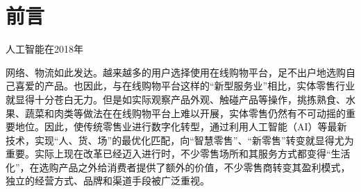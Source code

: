 \section{前\hspace{1em}言}

人工智能在2018年

网络、物流如此发达。越来越多的用户选择使用在线购物平台，足不出户地选购自己喜爱的产品。也因此，与在线购物平台这样的“新型服务业”相比，实体零售行业就显得十分苍白无力。但是如实际观察产品外观、触碰产品等操作，挑拣熟食、水果、蔬菜和肉类等做法在在线购物平台上难以开展，实体零售仍然有不可动摇的重要地位。因此，使传统零售业进行数字化转型，通过利用人工智能（AI）等最新技术，实现“人、货、场”的最优化匹配，向“智慧零售”、“新零售”转变就显得尤为重要。实际上现在改革已经迈入进行时，不少零售场所和其服务方式都变得“生活化”，在选购产品之外给消费者提供了额外的价值，不少零售商转变其盈利模式，独立的经营方式、品牌和渠道手段被广泛重视。

